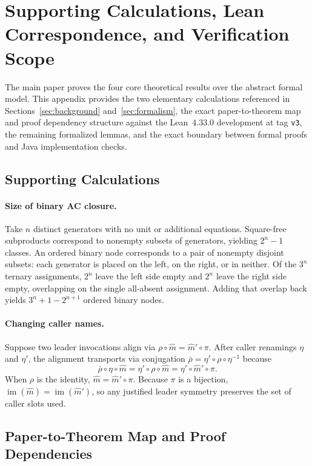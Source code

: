 \section{Supporting Calculations, Lean Correspondence, and Verification Scope}
\label{app:formal-details}

The main paper proves the four core theoretical results over the abstract
formal model. This appendix provides the two elementary calculations referenced
in Sections~\ref{sec:background} and~\ref{sec:formalism}, the exact
paper-to-theorem map and proof dependency structure against the Lean~4.33.0
development at tag \texttt{v3}, the remaining formalized lemmas, and the exact
boundary between formal proofs and Java implementation checks.

\subsection{Supporting Calculations}

\paragraph{Size of binary AC closure.}
Take $n$ distinct generators with no unit or additional equations. Square-free
subproducts correspond to nonempty subsets of generators, yielding $2^n-1$
classes. An ordered binary node corresponds to a pair of nonempty disjoint
subsets: each generator is placed on the left, on the right, or in neither.
Of the $3^n$ ternary assignments, $2^n$ leave the left side empty and $2^n$
leave the right side empty, overlapping on the single all-absent assignment.
Adding that overlap back yields $3^n+1-2^{n+1}$ ordered binary nodes.

\paragraph{Changing caller names.}
Suppose two leader invocations align via
$\rho\circ\widehat m=\widehat m'\circ\pi$. After caller renamings $\eta$ and
$\eta'$, the alignment transports via conjugation
$\bar\rho=\eta'\circ\rho\circ\eta^{-1}$ because
\[
 \bar\rho\circ\eta\circ\widehat m
 =\eta'\circ\rho\circ\widehat m
 =\eta'\circ\widehat m'\circ\pi.
\]
When $\rho$ is the identity, $\widehat m=\widehat m'\circ\pi$. Because $\pi$ is
a bijection, $\operatorname{im}(\widehat m)=\operatorname{im}(\widehat m')$, so
any justified leader symmetry preserves the set of caller slots used.

\subsection{Paper-to-Theorem Map and Proof Dependencies}

